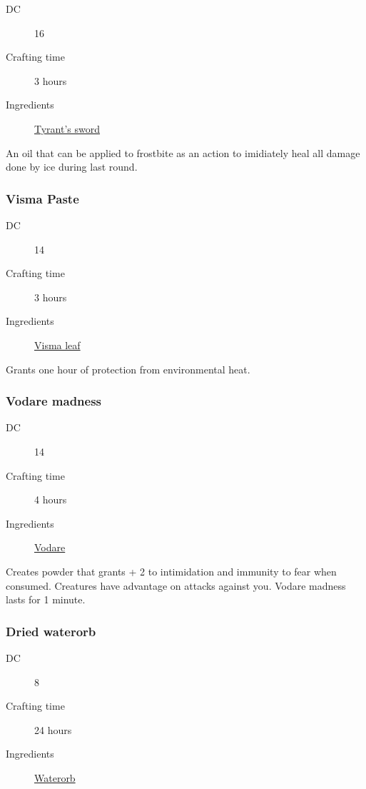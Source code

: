 \begin{description}
\item [DC] 16
\item [Crafting time] 3 hours
\item [Ingredients] \hyperref[Tyrant's Sword]{Tyrant's sword}
\end{description}

An oil that can be applied to frostbite as an action to imidiately heal all damage done by ice 
during last round.

\subsubsection{Visma Paste}
\label{Visma Paste}

\begin{description}
\item [DC] 14
\item [Crafting time] 3 hours
\item [Ingredients] \hyperref[Visma]{Visma leaf}
\end{description}

Grants one hour of protection from environmental heat.

\subsubsection{Vodare madness}
\label{Vodare madness}

\begin{description}
\item [DC] 14
\item [Crafting time] 4 hours
\item [Ingredients] \hyperref[Vodare]{Vodare}
\end{description}

Creates powder that grants + 2 to intimidation and immunity to fear when consumed. 
Creatures have advantage on attacks against you. Vodare madness lasts for 1 minute.

\subsubsection{Dried waterorb}
\label{Dried waterorb}

\begin{description}
\item [DC] 8
\item [Crafting time] 24 hours
\item [Ingredients] \hyperref[Waterorb]{Waterorb}
\end{description}

